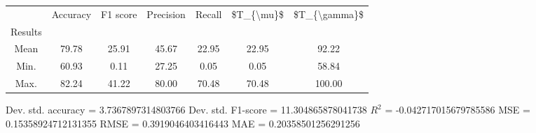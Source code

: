 \begin{tabular}{|c|c|c|c|c|c|c|}
\toprule
{} &  Accuracy &  F1 score &  Precision &  Recall &  \$T\_\{\textbackslash mu\}\$ &  \$T\_\{\textbackslash gamma\}\$ \\
Results &           &           &            &         &            &               \\
\hline
Mean    &     79.78 &     25.91 &      45.67 &   22.95 &      22.95 &         92.22 \\
Min.    &     60.93 &      0.11 &      27.25 &    0.05 &       0.05 &         58.84 \\
Max.    &     82.24 &     41.22 &      80.00 &   70.48 &      70.48 &        100.00 \\
\bottomrule
\end{tabular}

 Dev. std. accuracy = 3.7367897314803766
 Dev. std. F1-score = 11.304865878041738
 $R^2$ = -0.042717015679785586
 MSE = 0.15358924712131355
 RMSE = 0.3919046403416443
 MAE = 0.20358501256291256